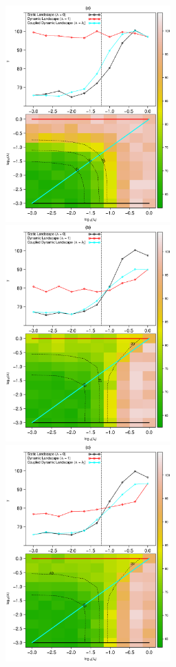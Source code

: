 \documentclass[12pt]{article}
\begin{document}
\begin{figure}[hb!]
\begin{center}
\includegraphics[width=2.5in]{./figures/new_A_r0_MeanGamma_001.eps}\hspace{-0.025 in}
\includegraphics[width=2.5in]{./figures/new_A_r0_MeanGamma_004.eps}\\
\includegraphics[width=2.5in]{./figures/new_A_r0_MeanGamma_007.eps}\hspace{-0.025 in}

\end{center}
\end{figure}
\end{document}
